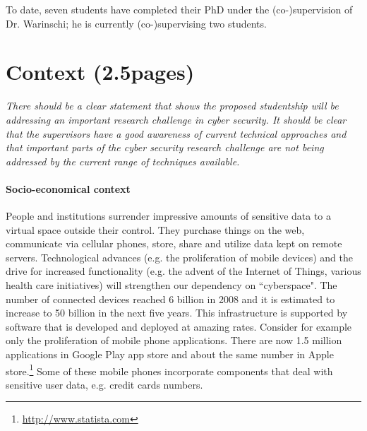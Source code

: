 \documentclass[10pt]{article}
\begin{document}


To date, seven students have completed their PhD under the (co-)supervision of Dr. Warinschi; he is currently (co-)supervising two 
students.


\section{Context (2.5pages)}
\emph{There should be a clear statement that shows the proposed studentship will be addressing an important research challenge in cyber security. It should be clear that the supervisors have a good awareness of current technical approaches and that important parts of the cyber security research challenge are not being addressed by the current range of techniques available.}


\paragraph{Socio-economical context}
People and institutions surrender impressive amounts of sensitive data to a virtual space outside
their control.
They purchase things on the web, communicate via cellular phones, store, share and utilize data kept on remote servers.
Technological advances (e.g. the proliferation of mobile devices) and the drive for increased
functionality (e.g. the advent of the Internet of Things, various health care initiatives) will
strengthen our dependency on ``cyberspace".
The number of connected devices reached 6 billion in 2008 and it is estimated to increase to 50
billion in the next five years.
This infrastructure is supported by software that is developed and deployed at amazing rates. 
Consider for example only the proliferation of mobile phone applications.
There are now 1.5 million applications in Google Play app store and about the same
number in Apple store.\footnote{\url{http://www.statista.com}}
Some of these mobile phones incorporate components that deal with sensitive user data, e.g. credit cards numbers.   
\end{document}
